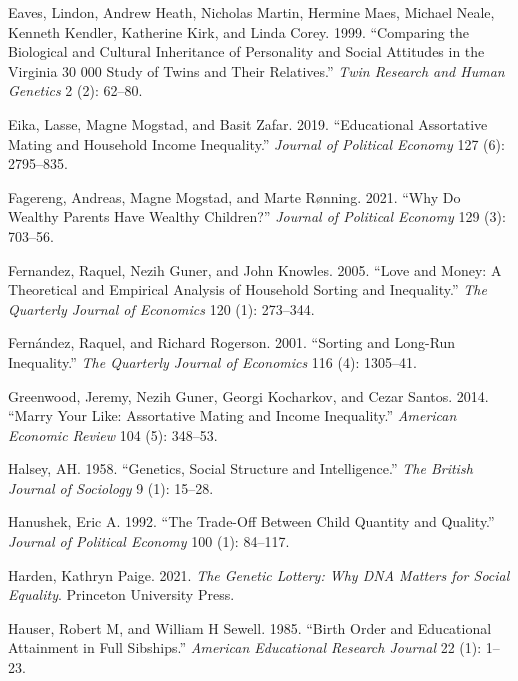 \documentclass[
  12pt,
]{article}
\newlength{\cslhangindent}
\newlength{\cslentryspacingunit} %
\newenvironment{CSLReferences}[2] %
 {%
  \setlength{\parindent}{0pt}
  \ifodd #1
  \let\oldpar\par
  \def\par{\hangindent=\cslhangindent\oldpar}
  \fi
  \setlength{\parskip}{#2\cslentryspacingunit}
 }%
 {}
\theoremstyle{definition}
\theoremstyle{definition}
\theoremstyle{definition}
\theoremstyle{definition}
\theoremstyle{remark}
\begin{document}
\begin{CSLReferences}{1}{0}
\leavevmode{}%
Eaves, Lindon, Andrew Heath, Nicholas Martin, Hermine Maes, Michael Neale, Kenneth Kendler, Katherine Kirk, and Linda Corey. 1999. {``Comparing the Biological and Cultural Inheritance of Personality and Social Attitudes in the Virginia 30 000 Study of Twins and Their Relatives.''} \emph{Twin Research and Human Genetics} 2 (2): 62--80.

\leavevmode{}%
Eika, Lasse, Magne Mogstad, and Basit Zafar. 2019. {``Educational Assortative Mating and Household Income Inequality.''} \emph{Journal of Political Economy} 127 (6): 2795--835.

\leavevmode{}%
Fagereng, Andreas, Magne Mogstad, and Marte Rønning. 2021. {``Why Do Wealthy Parents Have Wealthy Children?''} \emph{Journal of Political Economy} 129 (3): 703--56.

\leavevmode{}%
Fernandez, Raquel, Nezih Guner, and John Knowles. 2005. {``Love and Money: A Theoretical and Empirical Analysis of Household Sorting and Inequality.''} \emph{The Quarterly Journal of Economics} 120 (1): 273--344.

\leavevmode{}%
Fernández, Raquel, and Richard Rogerson. 2001. {``Sorting and Long-Run Inequality.''} \emph{The Quarterly Journal of Economics} 116 (4): 1305--41.

\leavevmode{}%
Greenwood, Jeremy, Nezih Guner, Georgi Kocharkov, and Cezar Santos. 2014. {``Marry Your Like: Assortative Mating and Income Inequality.''} \emph{American Economic Review} 104 (5): 348--53.

\leavevmode{}%
Halsey, AH. 1958. {``Genetics, Social Structure and Intelligence.''} \emph{The British Journal of Sociology} 9 (1): 15--28.

\leavevmode{}%
Hanushek, Eric A. 1992. {``The Trade-Off Between Child Quantity and Quality.''} \emph{Journal of Political Economy} 100 (1): 84--117.

\leavevmode{}%
Harden, Kathryn Paige. 2021. \emph{The Genetic Lottery: Why DNA Matters for Social Equality}. Princeton University Press.

\leavevmode{}%
Hauser, Robert M, and William H Sewell. 1985. {``Birth Order and Educational Attainment in Full Sibships.''} \emph{American Educational Research Journal} 22 (1): 1--23.


\end{CSLReferences}
\end{document}
